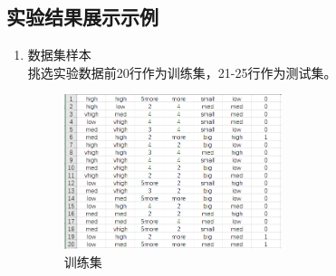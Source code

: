 \documentclass[UTF8,a4paper,12pt]{article}
\begin{document}
\subsection{实验结果展示示例}
\begin{enumerate}[itemindent=0.5em,label=\arabic*、]
  \item 数据集样本\\
  挑选实验数据前20行作为训练集，21-25行作为测试集。
  \begin{figure}[h]
  \begin{center}
  \includegraphics[width=0.6\textwidth]{p8.png}
  \caption{训练集}
  \end{center}
  \end{figure}


\end{enumerate}
\end{document}
